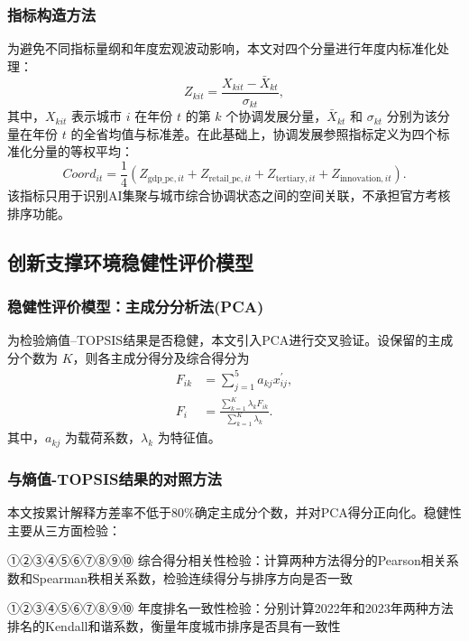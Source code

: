 \documentclass[12pt, a4paper]{ctexart}
\newcommand{\circlednum}[1]{%
    \mbox{{\papersymbolfont\ifcase#1\or ①\or ②\or ③\or ④\or ⑤\or ⑥\or ⑦\or ⑧\or ⑨\or ⑩\else #1\fi}}%
}
\newcommand{\one}{\circlednum{1}}
\newcommand{\two}{\circlednum{2}}
\begin{document}
\subsubsection{指标构造方法}
为避免不同指标量纲和年度宏观波动影响，本文对四个分量进行年度内标准化处理：
\begin{equation}
    Z_{kit}=\frac{X_{kit}-\bar{X}_{kt}}{\sigma_{kt}},
\end{equation}
其中，$X_{kit}$ 表示城市 $i$ 在年份 $t$ 的第 $k$ 个协调发展分量，$\bar{X}_{kt}$ 和 $\sigma_{kt}$ 分别为该分量在年份 $t$ 的全省均值与标准差。在此基础上，协调发展参照指标定义为四个标准化分量的等权平均：
\begin{equation}
    Coord_{it}=\frac{1}{4}\left(
    Z_{\text{gdp\_pc},it}
    +Z_{\text{retail\_pc},it}
    +Z_{\text{tertiary},it}
    +Z_{\text{innovation},it}
    \right).
\end{equation}
该指标只用于识别AI集聚与城市综合协调状态之间的空间关联，不承担官方考核排序功能。

\subsection{创新支撑环境稳健性评价模型}

\subsubsection{稳健性评价模型：主成分分析法(PCA)}
为检验熵值--TOPSIS结果是否稳健，本文引入PCA进行交叉验证。设保留的主成分个数为 $K$，则各主成分得分及综合得分为
\begin{equation}
    \begin{aligned}
        F_{ik} &= \sum_{j=1}^{5}a_{kj}x_{ij}^{\prime},\\
        F_i &= \frac{\sum_{k=1}^{K}\lambda_kF_{ik}}{\sum_{k=1}^{K}\lambda_k}.
    \end{aligned}
\end{equation}
其中，$a_{kj}$ 为载荷系数，$\lambda_k$ 为特征值。


\subsubsection{与熵值-TOPSIS结果的对照方法}
本文按累计解释方差率不低于80\%确定主成分个数，并对PCA得分正向化。稳健性主要从三方面检验：

{\songti \one 综合得分相关性检验：}计算两种方法得分的Pearson相关系数和Spearman秩相关系数，检验连续得分与排序方向是否一致

{\songti \two 年度排名一致性检验：}分别计算2022年和2023年两种方法排名的Kendall和谐系数，衡量年度城市排序是否具有一致性
\end{document}
